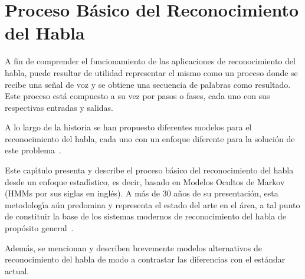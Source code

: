 \chapter{Proceso B\'{a}sico del Reconocimiento del Habla}
\label{sec:proceso}

A fin de comprender el funcionamiento de las aplicaciones de reconocimiento del habla, puede resultar de utilidad
representar el mismo como un proceso donde se recibe una se\~nal de voz y se obtiene una secuencia de palabras como
resultado. Este proceso est\'a compuesto a su vez por pasos o fases, cada uno con sus respectivas entradas y salidas.

A lo largo de la historia se han propuesto diferentes modelos para el reconocimiento del habla, cada uno
con un enfoque diferente para la soluci\'on de este \mbox{problema \cite{VimalaReview2012}}. 

Este cap{\'\i}tulo presenta y describe el proceso b\'asico del reconocimiento del habla desde un 
enfoque estad{\'\i}stico, es decir, basado en Modelos Ocultos de Markov (HMMs por sus siglas en ingl\'es). 
A m\'as de 30 a\~nos de su presentaci\'on, esta metodolog{\'\i}a a\'un predomina y representa el estado 
del arte en el \'area, a tal punto de constituir la base de los sistemas modernos de reconocimiento del habla 
de prop\'osito \mbox{general \cite{BakerResearch2009, VimalaReview2012}}.

Adem\'as, se mencionan y describen brevemente modelos alternativos de reconocimiento del habla de modo a contrastar
las diferencias con el est\'andar actual.




